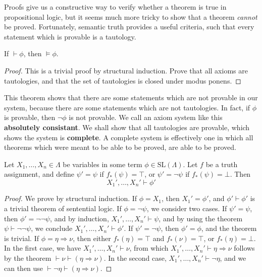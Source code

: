 Proofs give us a constructive way to verify whether a theorem is true in propositional logic, but it seems much more tricky to show that a theorem {\it cannot} be proved. Fortunately, semantic truth provides a useful criteria, such that every statement which is provable is a tautology.

\begin{theorem}
    If $\vdash \phi$, then $\vDash \phi$.
\end{theorem}
\begin{proof}
    This is a trivial proof by structural induction. Prove that all axioms are tautologies, and that the set of tautologies is closed under modus ponens.
\end{proof}

This theorem shows that there are some statements which are not provable in our system, because there are some statements which are not tautologies. In fact, if $\phi$ is provable, then $\neg \phi$ is not provable. We call an axiom system like this {\bf absolutely consistant}. We shall show that all tautologies are provable, which shows the system is {\bf complete}. A complete system is effectively one in which all theorems which were meant to be able to be proved, are able to be proved.

\begin{lemma}
    Let $X_1, \dots, X_n \in \Lambda$ be variables in some term $\phi \in \text{SL}(\Lambda)$. Let $f$ be a truth assignment, and define $\psi' = \psi$ if $f_*(\psi) = \top$, or $\psi' = \neg \psi$ if $f_*(\psi) = \bot$. Then
    \[ X_1', \dots, X_n' \vdash \phi' \]
\end{lemma}
\begin{proof}
    We prove by structural induction. If $\phi = X_1$, then $X_1' = \phi'$, and $\phi' \vdash \phi'$ is a trivial theorem of sentential logic. If $\phi = \neg \psi$, we consider two cases. If $\psi' = \psi$, then $\phi' = \neg \neg \psi$, and by induction, $X_1', \dots, X_n' \vdash \psi$, and by using the theorem $\psi \vdash \neg \neg \psi$, we conclude $X_1', \dots, X_n' \vdash \phi'$. If $\psi' = \neg \psi$, then $\phi' = \phi$, and the theorem is trivial. If $\phi = \eta \Rightarrow \nu$, then either $f_*(\eta) = \top$ and $f_*(\nu) = \top$, or $f_*(\eta) = \bot$. In the first case, we have $X_1', \dots, X_n' \vdash \nu$, from which $X_1', \dots, X_n' \vdash \eta \Rightarrow \nu$ follows by the theorem $\vdash \nu \vdash (\eta \Rightarrow \nu)$. In the second case, $X_1', \dots, X_n' \vdash \neg \eta$, and we can then use $\vdash \neg \eta \vdash (\eta \Rightarrow \nu)$.
\end{proof}

